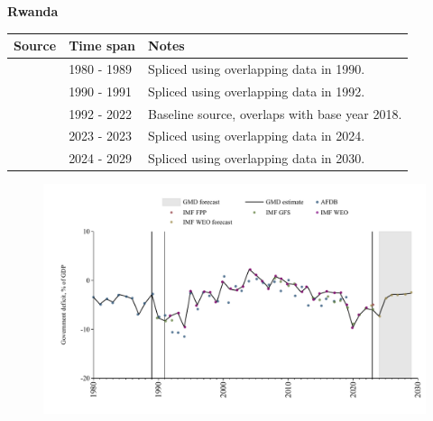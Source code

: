 \documentclass[12pt,a4paper,landscape]{article}
\begin{document}
\begin{adjustbox}{max totalsize={\paperwidth}{\paperheight},center}
\begin{minipage}[t][\textheight][t]{\textwidth}
\vspace*{0.5cm}
{}
\begin{center}
{\Large\bfseries Rwanda}
\end{center}
\vspace{0.5cm}
\begin{table}[H]
\centering
\small
\begin{tabular}{|l|l|l|}
\hline
\textbf{Source} & \textbf{Time span} & \textbf{Notes} \\
\hline
\rowcolor{white}\cite{AFDB}& 1980 - 1989 &Spliced using overlapping data in 1990.\\
\rowcolor{lightgray}\cite{IMF_GFS}& 1990 - 1991 &Spliced using overlapping data in 1992.\\
\rowcolor{white}\cite{IMF_WEO}& 1992 - 2022 &Baseline source, overlaps with base year 2018.\\
\rowcolor{lightgray}\cite{IMF_GFS}& 2023 - 2023 &Spliced using overlapping data in 2024.\\
\rowcolor{white}\cite{IMF_WEO_forecast}& 2024 - 2029 &Spliced using overlapping data in 2030.\\
\hline
\end{tabular}
\end{table}
\begin{figure}[H]
\centering
\includegraphics[width=\textwidth,height=0.6\textheight,keepaspectratio]{graphs/RWA_govdef_GDP.pdf}
\end{figure}
\end{minipage}
\end{adjustbox}
\end{document}
